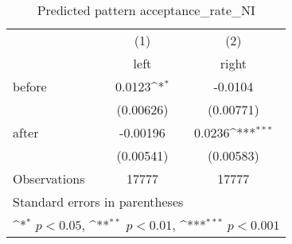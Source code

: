 \begin{table}[htbp]\centering
\def\sym#1{\ifmmode^{#1}\else\(^{#1}\)\fi}
\caption{Predicted pattern acceptance\_rate\_NI}
\begin{tabular}{l*{2}{c}}
\hline\hline
                    &\multicolumn{1}{c}{(1)}&\multicolumn{1}{c}{(2)}\\
                    &\multicolumn{1}{c}{left}&\multicolumn{1}{c}{right}\\
\hline
before              &      0.0123\sym{*}  &     -0.0104         \\
                    &   (0.00626)         &   (0.00771)         \\
[1em]
after               &    -0.00196         &      0.0236\sym{***}\\
                    &   (0.00541)         &   (0.00583)         \\
\hline
Observations        &       17777         &       17777         \\
\hline\hline
\multicolumn{3}{l}{\footnotesize Standard errors in parentheses}\\
\multicolumn{3}{l}{\footnotesize \sym{*} \(p<0.05\), \sym{**} \(p<0.01\), \sym{***} \(p<0.001\)}\\
\end{tabular}
\end{table}
